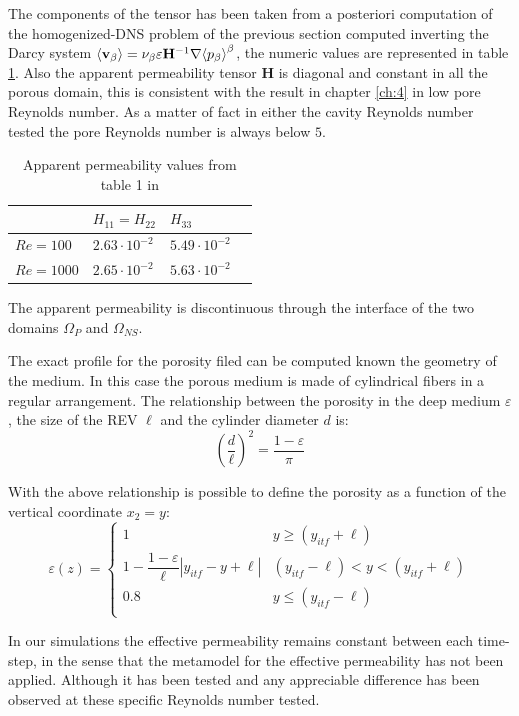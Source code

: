 The components of the tensor has been taken from a posteriori computation of the homogenized-DNS problem of the previous section computed inverting the Darcy system ${\left< \textbf{v}_{\beta} \right>} = \nu_{\beta} \varepsilon \mathbf{H}^{-1} \nabla {\left< p_{\beta}\right>}^{\beta}$, the numeric values are represented in table \ref{tab:H}.
Also the apparent permeability tensor $\mathbf{H}$ is diagonal and constant in all the porous domain, this is consistent with the result in chapter \ref{ch:4} in low pore Reynolds number. As a matter of fact in either the cavity Reynolds number tested the pore Reynolds number is always below $5$.

\begin{table}[h]
	\centering
	\begin{tabular}{ l | l |  l   l   }
		& $H_{11} = H_{22}$ & $H_{33}$ \\ 
		\hline
		\hline
		$Re=100$ & $2.63 \cdot 10^{-2}$ & $5.49 \cdot 10^{-2}$ \\ 
		$Re=1000$ & $2.65 \cdot 10^{-2}$ & $5.63 \cdot 10^{-2}$
	\end{tabular}
	\caption{Apparent permeability values from table 1 in \citet{zampogna2016fluid}}
	\label{tab:H}
\end{table}

The apparent permeability is discontinuous through the interface of the two domains $\Omega_P$ and $\Omega_{NS}$.

The exact profile for the porosity filed can be computed known the geometry of the medium. In this case the porous medium is made of cylindrical fibers in a regular  arrangement. The relationship between the porosity in the deep medium $\varepsilon$, the size of the REV $\ell$ and the cylinder diameter $d$ is:
$$
\left( \dfrac{d}{\ell} \right)^2 = \dfrac{1 - \varepsilon}{\pi}
$$

With the above relationship is possible to define the porosity as a function of the vertical coordinate $x_2 = y$:
\begin{equation}
\varepsilon(z) = 
\begin{cases}
1 & y\geqslant(y_{itf}+\ell) \\
1 - \dfrac{1-\varepsilon}{\ell}|y_{itf} -y +\ell| &  (y_{itf}-\ell)<y<(y_{itf}+\ell)\\
0.8 &y\leqslant(y_{itf}-\ell) \\
\end{cases}
\label{eq:porsitity_fun}
\end{equation}

In our simulations the effective permeability remains constant between each time-step, in the sense that the metamodel for the effective permeability has not been applied. Although it has been tested and any appreciable difference has been observed at these specific Reynolds number tested.

